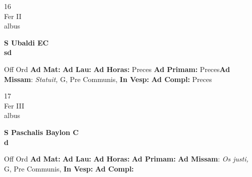 \documentclass[10pt, openany]{book}
\begin{document}
    \begin{center}
        \begin{minipage}{3.5in}
            \vspace{2em}
            \begin{minipage}{0.5in}
                {\Huge 16} \\
                {\normalsize Fer II} \\
                {\normalsize albus}
            \end{minipage}
            \begin{minipage}{3.0in}
                \textbf{ \large S Ubaldi EC \\
                \textnormal{\normalsize sd}} \\ 
            \end{minipage}
            \begin{justify}Off Ord
                \textbf{Ad Mat: }
                \textbf{Ad Lau: }
                \textbf{Ad Horas: }Preces
                \textbf{Ad Primam: }Preces\textbf{Ad Missam}: \textit{Statuit,} G, Pre Communis,  
                \textbf{In Vesp: }
                \textbf{Ad Compl: }Preces
            \end{justify}
        \end{minipage}
    \end{center}

    \begin{center}
        \begin{minipage}{3.5in}
            \vspace{2em}
            \begin{minipage}{0.5in}
                {\Huge 17} \\
                {\normalsize Fer III} \\
                {\normalsize albus}
            \end{minipage}
            \begin{minipage}{3.0in}
                \textbf{ \large S Paschalis Baylon C \\
                \textnormal{\normalsize d}} \\ 
            \end{minipage}
            \begin{justify}Off Ord
                \textbf{Ad Mat: }
                \textbf{Ad Lau: }
                \textbf{Ad Horas: }
                \textbf{Ad Primam: }\textbf{Ad Missam}: \textit{Os justi,} G, Pre Communis,  
                \textbf{In Vesp: }
                \textbf{Ad Compl: }
            \end{justify}
        \end{minipage}
    \end{center}
\end{document}
